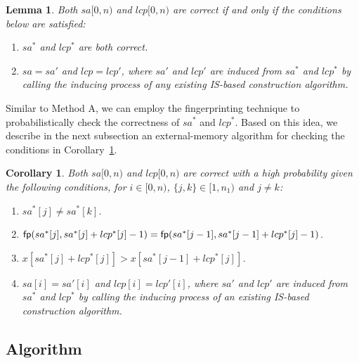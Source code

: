 \documentclass[10pt,journal,compsoc]{IEEEtran}
\newtheorem{Lemma}{Lemma}
\newtheorem{Corollary}{Corollary}
\begin{document}
\begin{Lemma} \label{lemma:2}
Both $sa[0, n)$ and $lcp[0, n)$ are correct if and only if the conditions below are satisfied:

\begin{enumerate}[(1)]
	\item
	$sa^*$ and $lcp^*$ are both correct.
	\item
	$sa = sa'$ and $lcp = lcp'$, where $sa'$ and $lcp'$ are induced from $sa^*$ and $lcp^*$ by calling the inducing process of any existing IS-based construction algorithm.
\end{enumerate}
\end{Lemma}

Similar to Method A, we can employ the fingerprinting technique to probabilistically check the correctness of $sa^*$ and $lcp^*$. Based on this idea, we describe in the next subsection an external-memory algorithm for checking the conditions in Corollary~\ref{corollary:2}.

\begin{Corollary} \label{corollary:2}
Both $sa[0, n)$ and $lcp[0, n)$ are correct with a high probability given the following conditions, for $i \in [0, n)$, $\{j, k\} \in [1, n_1)$ and $j \ne k$:
	
\begin{enumerate}[(1)]
	\item
	$sa^*[j] \ne sa^*[k]$.
	\item
	${\sf fp}(sa^*[j], sa^*[j] + lcp^*[j] - 1) = {\sf fp}(sa^*[j - 1], sa^*[j - 1] + lcp^*[j] - 1)$.
	\item
	$x[sa^*[j] + lcp^*[j]] > x[sa^*[j - 1] + lcp^*[j]]$.
	\item
	$sa[i] = sa'[i]$ and $lcp[i] = lcp'[i]$, where $sa'$ and $lcp'$ are induced from $sa^*$ and $lcp^*$ by calling the inducing process of an existing IS-based construction algorithm.
\end{enumerate}

\end{Corollary}


\subsection{Algorithm} \label{sec:method2:algorithm}
\end{document}
